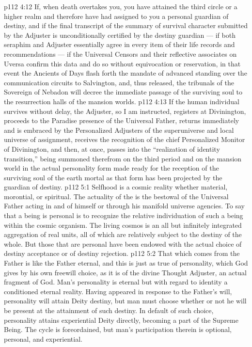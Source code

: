 \vs p112 4:12 \pc If, when death overtakes you, you have attained the third circle or a higher realm and therefore have had assigned to you a personal guardian of destiny, and if the final transcript of the summary of survival character submitted by the Adjuster is unconditionally certified by the destiny guardian --- if both seraphim and Adjuster essentially agree in every item of their life records and recommendations --- if the Universal Censors and their reflective associates on Uversa confirm this data and do so without equivocation or reservation, in that event the Ancients of Days flash forth the mandate of advanced standing over the communication circuits to Salvington, and, thus released, the tribunals of the Sovereign of Nebadon will decree the immediate passage of the surviving soul to the resurrection halls of the mansion worlds.
\vs p112 4:13 If the human individual survives without delay, the Adjuster, so I am instructed, registers at Divinington, proceeds to the Paradise presence of the Universal Father, returns immediately and is embraced by the Personalized Adjusters of the superuniverse and local universe of assignment, receives the recognition of the chief Personalized Monitor of Divinington, and then, at once, passes into the “realization of identity transition,” being summoned therefrom on the third period and on the mansion world in the actual personality form made ready for the reception of the surviving soul of the earth mortal as that form has been projected by the guardian of destiny.
\vs p112 5:1 Selfhood is a cosmic reality whether material, morontial, or spiritual. The actuality of the  is the bestowal of the Universal Father acting in and of himself or through his manifold universe agencies. To say that a being is personal is to recognize the relative individuation of such a being within the cosmic organism. The living cosmos is an all but infinitely integrated aggregation of real units, all of which are relatively subject to the destiny of the whole. But those that are personal have been endowed with the actual choice of destiny acceptance or of destiny rejection.
\vs p112 5:2 That which comes from the Father is like the Father eternal, and this is just as true of personality, which God gives by his own freewill choice, as it is of the divine Thought Adjuster, an actual fragment of God. Man’s personality is eternal but with regard to identity a conditioned eternal reality. Having appeared in response to the Father’s will, personality will attain Deity destiny, but man must choose whether or not he will be present at the attainment of such destiny. In default of such choice, personality attains experiential Deity directly, becoming a part of the Supreme Being. The cycle is foreordained, but man’s participation therein is optional, personal, and experiential.
